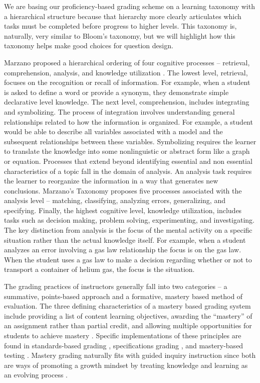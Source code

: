 \documentclass[10pt,letterpaper]{article}
\begin{document}
 We are basing our  proficiency-based grading scheme on a learning taxonomy with a hierarchical structure because that hierarchy more clearly articulates which tasks must be completed before progress to higher levels. This taxonomy is, naturally, very similar to Bloom's taxonomy, but we will highlight how this taxonomy helps make good choices for question design.

Marzano proposed a hierarchical ordering of four cognitive processes -- retrieval, comprehension, analysis, and knowledge utilization \citep{Marzano2006}. The lowest level, retrieval, focuses on the recognition or recall of information. For example, when a student is asked to define a word or provide a synonym, they demonstrate simple declarative level knowledge. The next level, comprehension, includes integrating and symbolizing. The process of integration involves understanding general relationships related to how the information is organized. For example, a student would be able to describe all variables associated with a model and the subsequent relationships between these variables. Symbolizing requires the learner to translate the knowledge into some nonlinguistic or abstract form like a graph or equation. Processes that extend beyond identifying essential and non essential characteristics of a topic fall in the domain of analysis. An analysis task requires the learner to reorganize the information in a way that generates new conclusions. Marzano's Taxonomy proposes five processes associated with the analysis level -- matching, classifying, analyzing errors, generalizing, and specifying. Finally, the highest cognitive level, knowledge utilization, includes tasks such as decision making, problem solving, experimenting, and investigating. The key distinction from analysis is the focus of the mental activity on a specific situation rather than the actual knowledge itself. For example, when a student analyzes an error involving a gas law relationship the focus is on the gas law. When the student uses a gas law to make a decision regarding whether or not to transport a container of helium gas, the focus is the situation. 


The grading practices of instructors generally fall into two categories -- a summative, points-based approach and a formative, mastery based method of evaluation. The three defining characteristics of a mastery based grading system include providing a list of content learning objectives, awarding the ``mastery'' of an assignment rather than partial credit, and allowing multiple opportunities for students to achieve mastery \citep{Kelly2020}. Specific implementations of these principles are found in standards-based grading \citep{Marzano2011}, specifications grading \citep{Nilson2015}, and mastery-based testing \citep{Collins2019}. Mastery grading naturally fits with guided inquiry instruction since both are ways of promoting a growth mindset by treating knowledge and learning as an evolving process \cite{selbach2020}.
\end{document}
